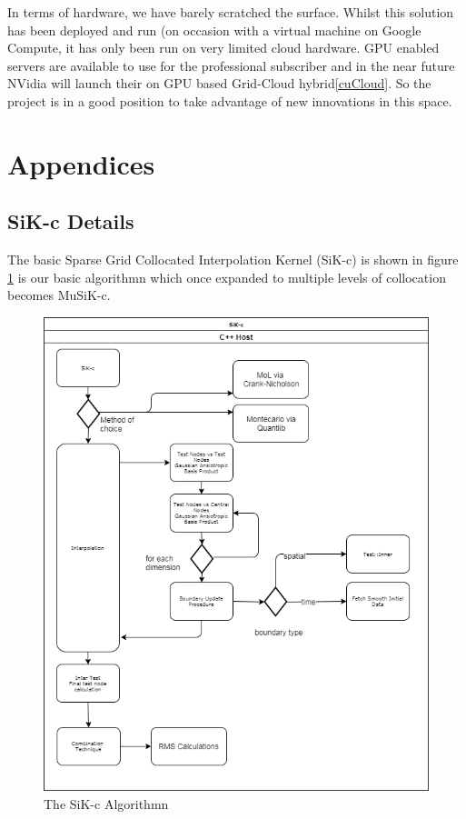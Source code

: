 \documentclass[a4paper]{amsart}
\begin{document}
In terms of hardware, we have barely scratched the surface. Whilst this solution has been deployed and run (on occasion with a virtual machine on Google Compute, it has only been run on very limited cloud hardware. GPU enabled servers are available to use for the professional subscriber and in the near future NVidia will launch their on GPU based Grid-Cloud hybrid\ref{cuCloud}. So the project is in a good position to take advantage of new innovations in this space.

\newpage
\section{Appendices}



\subsection{SiK-c Details} \label{appSiK}
The basic Sparse Grid Collocated Interpolation Kernel (SiK-c) is shown in figure \ref{fig:sikc1} is our basic algorithmn which once expanded to multiple levels of collocation becomes MuSiK-c.

\begin{figure}[h]
\centering
\includegraphics[scale=0.5]{SiKc1.png}
\caption {The SiK-c Algorithmn}
\label {fig:sikc1}
\end{figure}
\end{document}
